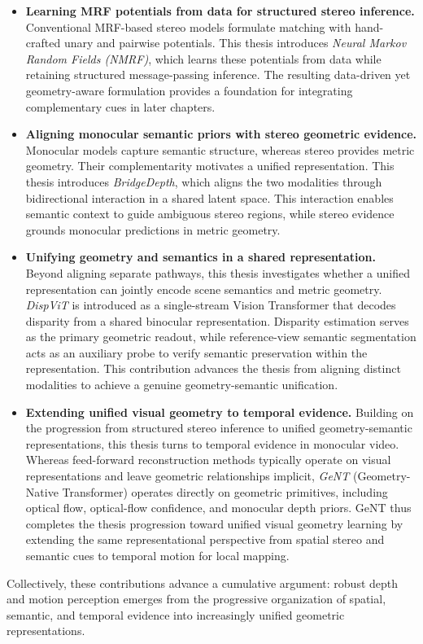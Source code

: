 \begin{itemize}[leftmargin=*]
    \item \textbf{Learning MRF potentials from data for structured stereo inference.} Conventional MRF-based stereo models formulate matching with hand-crafted unary and pairwise potentials.
    This thesis introduces \emph{Neural Markov Random Fields (NMRF)}, which learns these potentials from data while retaining structured message-passing inference.
    The resulting data-driven yet geometry-aware formulation provides a foundation for integrating complementary cues in later chapters.
    \item \textbf{Aligning monocular semantic priors with stereo geometric evidence.} Monocular models capture semantic structure, whereas stereo provides metric geometry. Their complementarity motivates a unified representation.
    This thesis introduces \emph{BridgeDepth}, which aligns the two modalities through bidirectional interaction in a shared latent space.
    This interaction enables semantic context to guide ambiguous stereo regions, while stereo evidence grounds monocular predictions in metric geometry.
    \item \textbf{Unifying geometry and semantics in a shared representation.} Beyond aligning separate pathways, this thesis investigates whether a unified representation can jointly encode scene semantics and metric geometry.
    \emph{DispViT} is introduced as a single-stream Vision Transformer that decodes disparity from a shared binocular representation.
    Disparity estimation serves as the primary geometric readout, while reference-view semantic segmentation acts as an auxiliary probe to verify semantic preservation within the representation.
    This contribution advances the thesis from aligning distinct modalities to achieve a genuine geometry-semantic unification.
    \item \textbf{Extending unified visual geometry to temporal evidence.} Building on the progression from structured stereo inference to unified geometry-semantic representations, this thesis turns to temporal evidence in monocular video.
    Whereas feed-forward reconstruction methods typically operate on visual representations and leave geometric relationships implicit, \emph{GeNT} (Geometry-Native Transformer) operates directly on geometric primitives, including optical flow, optical-flow confidence, and monocular depth priors.
    GeNT thus completes the thesis progression toward unified visual geometry learning by extending the same representational perspective from spatial stereo and semantic cues to temporal motion for local mapping.
\end{itemize}
Collectively, these contributions advance a cumulative argument: robust depth and motion perception emerges from the progressive organization of spatial, semantic, and temporal evidence into increasingly unified geometric representations.

